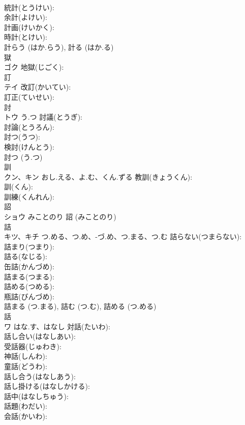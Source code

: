 \documentclass[8pt]{extreport}
\begin{document}
\begin{CJK}{UTF8}{min}
\\	統計(とうけい): 
\\	余計(よけい): 
\\	計画(けいかく): 
\\	時計(とけい): 
\\	計らう (はか.らう), 計る (はか.る)
\\	獄			
\\	ゴク		地獄(じごく): 
\\	訂		
\\	テイ		改訂(かいてい): 
\\	訂正(ていせい): 
\\	討			
\\	トウ	う.つ	討議(とうぎ): 
\\	討論(とうろん): 
\\	討つ(うつ): 
\\	検討(けんとう): 
\\	討つ (う.つ)
\\	訓			
\\	クン、キン	おし.える、よ.む、くん.ずる	教訓(きょうくん): 
\\	訓(くん): 
\\	訓練(くんれん): 
\\	詔		
\\	ショウ	みことのり		詔 (みことのり)
\\	詰			
\\	キツ、キチ	つ.める、つ.め、-づ.め、つ.まる、つ.む	詰らない(つまらない): 
\\	詰まり(つまり): 
\\	詰る(なじる): 
\\	缶詰(かんづめ): 
\\	詰まる(つまる): 
\\	詰める(つめる): 
\\	瓶詰(びんづめ): 
\\	詰まる (つ.まる), 詰む (つ.む), 詰める (つ.める)
\\	話			
\\	ワ	はな.す、はなし	対話(たいわ): 
\\	話し合い(はなしあい): 
\\	受話器(じゅわき): 
\\	神話(しんわ): 
\\	童話(どうわ): 
\\	話し合う(はなしあう): 
\\	話し掛ける(はなしかける): 
\\	話中(はなしちゅう): 
\\	話題(わだい): 
\\	会話(かいわ): 

\end{CJK}
\end{document}
